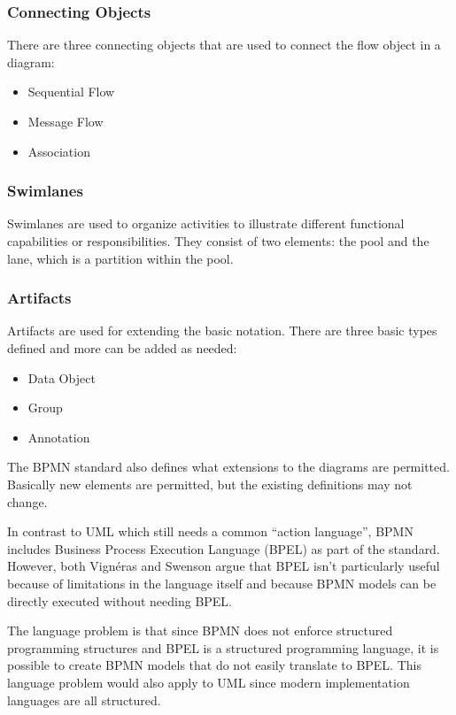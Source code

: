 \documentclass[10pt,journal,letterpaper,compsoc]{IEEEtran}
\begin{document}
\subsubsection{Connecting Objects}
There are three connecting objects that are used to connect the flow object in a diagram:
\begin{itemize}
  \item Sequential Flow
  \item Message Flow
  \item Association
\end{itemize}

\subsubsection{Swimlanes}
Swimlanes are used to organize activities to illustrate different functional capabilities or responsibilities.  They consist of two elements: the pool and the lane, which is a partition within the pool.

\subsubsection{Artifacts}
Artifacts are used for extending the basic notation.  There are three basic types defined and more can be added as needed:
\begin{itemize}
  \item Data Object
  \item Group
  \item Annotation
\end{itemize}

The BPMN standard\cite{BPMN20} also defines what extensions to the diagrams are permitted.  Basically new elements are permitted, but the existing definitions may not change.

In contrast to UML which still needs a common ``action language''\cite{Mellor2007}, BPMN includes Business Process Execution Language (BPEL) as part of the standard\cite{BPMN20}.  However, both  Vign\'{e}ras\cite{Vigneras2008} and Swenson\cite{Swenson2011} argue that BPEL isn't particularly useful because of limitations in the language itself and because BPMN models can be directly executed without needing BPEL.

The language problem is that since BPMN does not enforce structured programming structures and BPEL is a structured programming language, it is possible to create BPMN models that do not easily translate to BPEL.  This language problem would also apply to UML since modern implementation languages are all structured.
\end{document}
